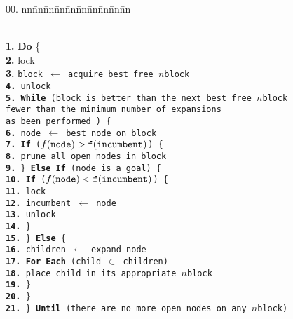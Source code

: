 \documentclass{article}
\newcommand{\bncode}{
  \begin{tabbing}
    00. nn\=nn\=nn\=nn\=nn\=nn\=nn\=nn\=nn\=nn\kill
}
\newcommand{\ecode}{
  \end{tabbing}
}
\newcommand{\var}[1]{\tt #1}
\newcommand{\Assign}[2]{#1 $\leftarrow$ #2}
\newcommand{\If}[1]{{\bf If} (#1)}
\newcommand{\Elif}[1]{{\bf Else If} (#1)}
\newcommand{\Else}{{\bf Else} }
\newcommand{\Do}{{\bf Do} \{}
\newcommand{\Until}[1]{\} {\bf Until} (#1)}
\newcommand{\ForEach}[1]{{\bf For Each} (#1)}
\newcommand{\While}[1]{{\bf While} (#1)}
\begin{document}
\bncode
\label{alg:pbnfsearch}
\\
  {\bf 1.}  \Do \\
  {\bf 2.}  \> lock \\
  {\bf 3.}  \> \Assign{\var{block}}{acquire best free $n$block} \\
  {\bf 4.}  \> unlock \\
  {\bf 5.}  \> \While{\var{block} is better than the next best free $n$block \\
    \hspace*{2.2cm}{\bf or} fewer than the minimum number of expansions \\
    \hspace*{2.2cm}as been performed } \{ \\
  {\bf 6.}  \> \> \Assign{\var{node}}{best node on \var{block}} \\
  {\bf 7.}  \> \> \If{$f(\var{node}) > f(\var{incumbent})$} \{ \\
  {\bf 8.}  \> \> \> prune all open nodes in \var{block} \\
  {\bf 9.}  \> \> \} \Elif{\var{node} is a goal} \{ \\
  {\bf 10.}  \> \> \> \If{$f(\var{node}) < f(\var{incumbent})$} \{ \\
  {\bf 11.}  \> \> \> \> lock \\
  {\bf 12.}  \> \> \> \> \Assign{\var{incumbent}}{\var{node}} \\
  {\bf 13.}  \> \> \> \> unlock \\
  {\bf 14.}  \> \> \> \} \\
  {\bf 15.}  \> \> \} \Else \{ \\
  {\bf 16.}  \> \> \> \Assign{\var{children}}{expand \var{node}} \\
  {\bf 17.}  \> \> \> \ForEach{\var{child} $\in$ \var{children}} \\
  {\bf 18.}  \> \> \> \> place \var{child} in its appropriate $n$block \\
  {\bf 19.}  \> \> \} \\
  {\bf 20.}  \> \} \\
  {\bf 21.}  \Until{there are no more open nodes on any $n$block}
  \ecode
\end{document}

